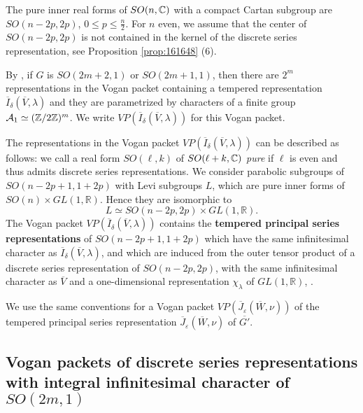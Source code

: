 The pure inner real forms of $SO(n,{\mathbb C})$
 with a compact Cartan subgroup are $SO(n-2p,2p)$, $0 \leq p \leq \frac n2$.  
For $n$ even, 
 we  assume that the center of $SO(n-2p,2p)$ is not contained
 in the kernel of the discrete series representation, 
 see Proposition \ref{prop:161648} (6).  



By \cite[p.~35]{A1},
 if $G$ is $SO(2m+2,1)$ or $SO(2m+1,1)$,
 then there are $2^m$ representations
 in the Vogan packet containing a tempered representation
 $\overline{I}_{\delta}(\overline{V},\lambda)$
 and they are parametrized by characters
 of a finite group ${\mathcal{A}}_1 \simeq ({\mathbb Z}/2{\mathbb Z})^m$.  
We write
 $VP(\overline{I}_\delta(\overline{V},\lambda))$
for this Vogan packet.



The representations in the Vogan packet 
 $VP(\overline{I}_\delta(\overline{V},\lambda))$
 can be described as  follows: 
 we call a real form $SO(\ell,k)$ of $SO(\ell + k,{\mathbb C})$ 
{\it{pure}}
 if $\ell$ is even and thus admits discrete series representations.
We consider parabolic subgroups of $SO(n-2p+1,1+2p)$ with Levi subgroups $L$,
 which are pure inner forms of
 $ SO(n) \times GL(1,{\mathbb{R}})$.  
Hence they are isomorphic to 
\[
   L \simeq SO(n-2p,2p) \times GL(1,{\mathbb{R}}).  
\]
The Vogan packet $VP(\overline{I}_\delta(\overline{V},\lambda ))$
 contains the {\bf tempered principal series representations}
 of $SO(n-2p+1,1+2p)$
 which have the same infinitesimal character
 as $\overline{I}_\delta(\overline{V},\lambda)$, 
 and which are induced from the outer tensor product of a discrete series representation of $SO(n-2p,2p)$, with the same infinitesimal character
 as $\overline{V}$  and a one-dimensional representation $\chi_\lambda$ of $GL(1,\mathbb{R})$, 
 \cite{V}.  

We use the same conventions
 for a Vogan packet $VP(\overline{J}_\varepsilon(\overline{W},\nu))$
 of the tempered principal series representation
 $\overline{J}_\varepsilon(\overline{W},\nu)$ of $\overline{G'}$.


\subsection{Vogan packets of discrete series representations with integral infinitesimal character of $SO(2m,1)$} 

